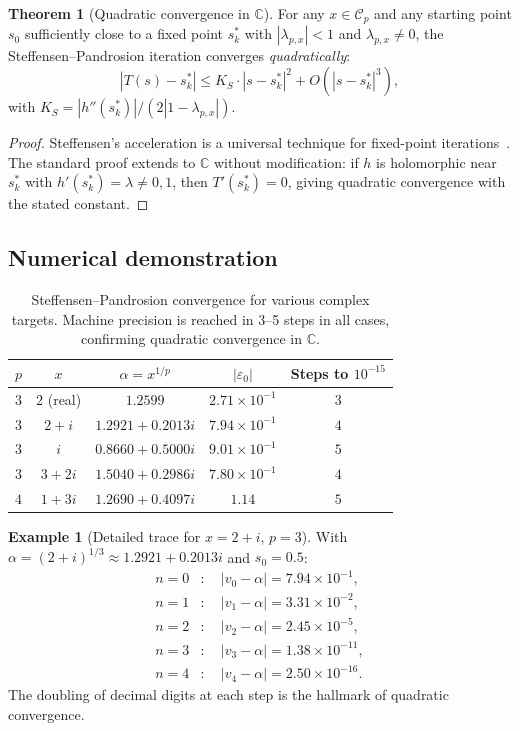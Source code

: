\documentclass[11pt,a4paper]{article}
\theoremstyle{definition}
\newtheorem{theorem}{Theorem}[section]
\newtheorem{example}{Example}[section]
\newcommand{\eps}{\varepsilon}
\newcommand{\CC}{\mathbb{C}}
\begin{document}
\begin{theorem}[Quadratic convergence in $\CC$]
\label{thm:steffensen_complex}
For any $x \in \mathcal{C}_p$ and any starting point $s_0$ sufficiently close to a fixed point $s_k^*$ with $|\lambda_{p,x}| < 1$ and $\lambda_{p,x} \neq 0$, the Steffensen--Pandrosion iteration converges \emph{quadratically}:
\[
  |T(s) - s_k^*| \leq K_S \cdot |s - s_k^*|^2 + O(|s - s_k^*|^3),
\]
with $K_S = |h''(s_k^*)| / (2|1 - \lambda_{p,x}|)$.
\end{theorem}

\begin{proof}
Steffensen's acceleration is a universal technique for fixed-point iterations~\cite{stoer}.  The standard proof extends to $\CC$ without modification: if $h$ is holomorphic near $s_k^*$ with $h'(s_k^*) = \lambda \neq 0, 1$, then $T'(s_k^*) = 0$, giving quadratic convergence with the stated constant.
\end{proof}

\subsection{Numerical demonstration}

\begin{table}[h]
\centering
\begin{tabular}{ccccc}
\toprule
$p$ & $x$ & $\alpha = x^{1/p}$ & $|\eps_0|$ & Steps to $10^{-15}$ \\
\midrule
$3$ & $2$ (real) & $1.2599$ & $2.71 \times 10^{-1}$ & $3$ \\
$3$ & $2+i$ & $1.2921 + 0.2013i$ & $7.94 \times 10^{-1}$ & $4$ \\
$3$ & $i$ & $0.8660 + 0.5000i$ & $9.01 \times 10^{-1}$ & $5$ \\
$3$ & $3+2i$ & $1.5040 + 0.2986i$ & $7.80 \times 10^{-1}$ & $4$ \\
$4$ & $1+3i$ & $1.2690 + 0.4097i$ & $1.14$ & $5$ \\
\bottomrule
\end{tabular}
\caption{Steffensen--Pandrosion convergence for various complex targets.  Machine precision is reached in 3--5 steps in all cases, confirming quadratic convergence in $\CC$.}
\label{tab:steffensen_complex}
\end{table}

\begin{example}[Detailed trace for $x = 2+i$, $p = 3$]
With $\alpha = (2+i)^{1/3} \approx 1.2921 + 0.2013i$ and $s_0 = 0.5$:
\begin{align*}
  n=0&: \quad |v_0 - \alpha| = 7.94 \times 10^{-1}, \\
  n=1&: \quad |v_1 - \alpha| = 3.31 \times 10^{-2}, \\
  n=2&: \quad |v_2 - \alpha| = 2.45 \times 10^{-5}, \\
  n=3&: \quad |v_3 - \alpha| = 1.38 \times 10^{-11}, \\
  n=4&: \quad |v_4 - \alpha| = 2.50 \times 10^{-16}.
\end{align*}
The doubling of decimal digits at each step is the hallmark of quadratic convergence.
\end{example}
\end{document}
